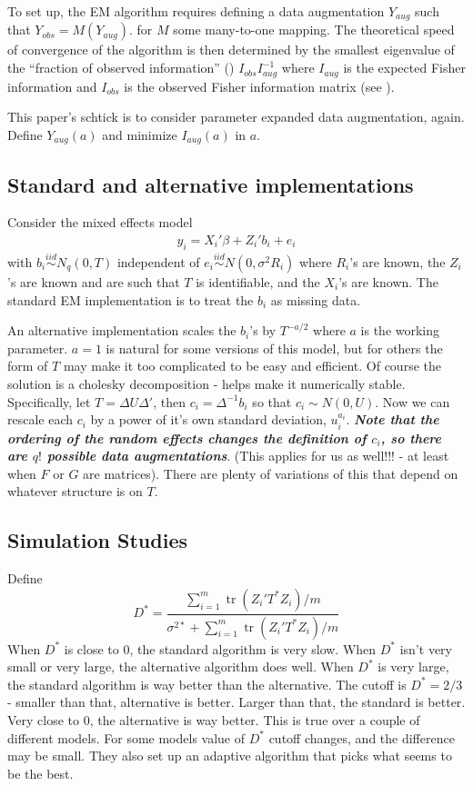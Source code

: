 \documentclass{article}\usepackage[]{graphicx}\usepackage[]{color}
\DeclareMathOperator{\tr}{tr}
\begin{document}
To set up, the EM algorithm requires defining a data augmentation $Y_{aug}$ such that $Y_{obs}=M(Y_{aug})$. for $M$ some many-to-one mapping. The theoretical speed of convergence of the algorithm is then determined by the smallest eigenvalue of the ``fraction of observed information'' (\citet{dempster1977maximum}) $I_{obs}I_{aug}^{-1}$ where $I_{aug}$ is the expected Fisher information and $I_{obs}$ is the observed Fisher information matrix (see \citet{meng1997algorithm}).

This paper's schtick is to consider parameter expanded data augmentation, again. Define $Y_{aug}(a)$ and minimize $I_{aug}(a)$ in $a$. 

\subsection{Standard and alternative implementations}
Consider the mixed effects model
\begin{align*}
  y_i = X_i'\beta + Z_i'b_i + e_i
\end{align*}
with $b_i\stackrel{iid}{\sim} N_q(0,T)$ independent of $e_i\stackrel{iid}{\sim} N(0,\sigma^2 R_i)$ where $R_i$'s are known, the $Z_i$'s are known and are such that $T$ is identifiable, and the $X_i$'s are known. The standard EM implementation is to treat the $b_i$ as missing data.

An alternative implementation scales the $b_i$'s by $T^{-a/2}$ where $a$ is the working parameter. $a=1$ is natural for some versions of this model, but for others the form of $T$ may make it too complicated to be easy and efficient. Of course the solution is a cholesky decomposition - helps make it numerically stable. Specifically, let $T=\Delta U \Delta'$, then $c_i=\Delta^{-1}b_i$ so that $c_i\sim N(0,U)$. Now we can rescale each $c_i$ by a power of it's own standard deviation, $u_i^{a_i}$. {\it \bf Note that the ordering of the random effects changes the definition of $c_i$, so there are $q!$ possible data augmentations}. (This applies for us as well!!! - at least when $F$ or $G$ are matrices). There are plenty of variations of this that depend on whatever structure is on $T$.

\subsection{Simulation Studies}
Define
\[
D^* = \frac{\sum_{i=1}^m\tr(Z_i'T^*Z_i)/m}{\sigma^{2*} + \sum_{i=1}^m\tr(Z_i'T^*Z_i)/m}
\]
When $D^*$ is close to 0, the standard algorithm is very slow. When $D^*$ isn't very small or very large, the alternative algorithm does well. When $D^*$ is very large, the standard algorithm is way better than the alternative. The cutoff is $D^*=2/3$ - smaller than that, alternative is better. Larger than that, the standard is better. Very close to 0, the alternative is way better. This is true over a couple of different models. For some models value of $D^*$ cutoff changes, and the difference may be small. They also set up an adaptive algorithm that picks what seems to be the best.
\end{document}
